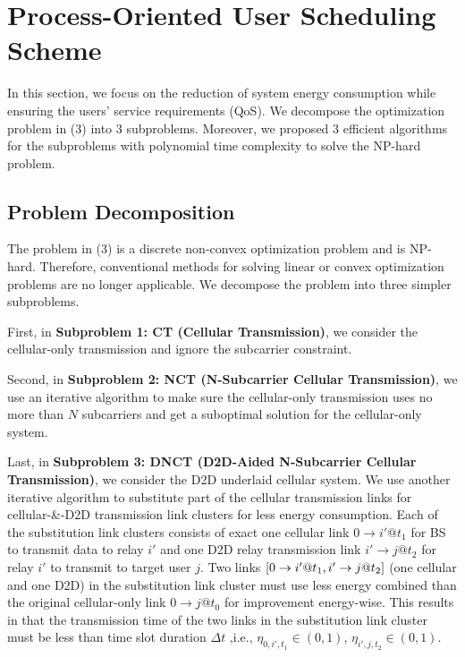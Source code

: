\documentclass{ieeeaccess}
\begin{document}
\section{Process-Oriented User Scheduling Scheme}
In this section, we focus on the reduction of system energy consumption while ensuring the users' service requirements (QoS). We decompose the optimization problem in (3) into 3 subproblems. Moreover, we proposed 3 efficient algorithms for the subproblems with polynomial time complexity to solve the NP-hard problem.


\subsection{Problem Decomposition}

The problem in (3) is a discrete non-convex optimization problem and is NP-hard. Therefore, conventional methods for solving linear or convex optimization problems are no longer applicable. We decompose the problem into three simpler subproblems.

First, in \textbf{Subproblem 1: CT (Cellular Transmission)}, we consider the cellular-only transmission and ignore the subcarrier constraint.

Second, in \textbf{Subproblem 2: NCT (N-Subcarrier Cellular Transmission)}, we use an iterative algorithm to make sure the cellular-only transmission uses no more than $N$ subcarriers and get a suboptimal solution for the cellular-only system.

Last, in \textbf{Subproblem 3: DNCT (D2D-Aided N-Subcarrier Cellular Transmission)}, we consider the D2D underlaid cellular system. We use another iterative algorithm to substitute part of the cellular transmission links for cellular-\&-D2D transmission link clusters for less energy consumption. Each of the substitution link clusters consists of exact one cellular link $0 \to i'@{t_1}$ for BS to transmit data to relay ${i'}$ and one D2D relay transmission link $i' \to j@{t_2}$ for relay ${i'}$ to transmit to target user $j$. Two links $\left[ {{\rm{0}} \to i'@{t_1},i' \to j@{t_2}} \right]$ (one cellular and one D2D) in the substitution link cluster must use less energy combined than the original cellular-only link $0 \to j@{t_0}$ for improvement energy-wise. This results in that the transmission time of the two links in the substitution link cluster must be less than time slot duration $\Delta t$ ,i.e., ${\eta _{0,i',{t_1}}} \in \left( {0,1} \right)$, ${\eta _{i',j,{t_2}}} \in \left( {0,1} \right)$.
\end{document}
